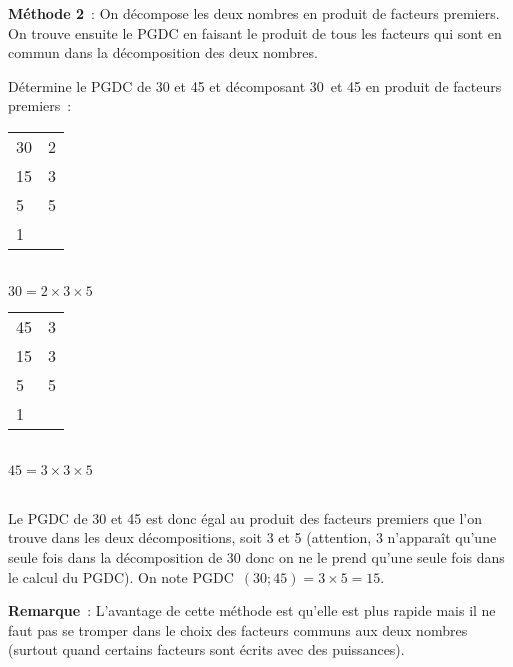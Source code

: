 \newpage




\begin{methode*1}

\textcolor{H1}{\textbf{Méthode 2}} : On décompose les deux nombres en produit de facteurs premiers. On trouve ensuite le PGDC en faisant le produit de tous les facteurs qui sont en commun dans la décomposition des deux nombres.

\begin{exemple*1}
Détermine le PGDC de 30 et 45 et décomposant 30 et 45 en produit de facteurs premiers : \\[1em]
\begin{minipage}[t]{0.26\textwidth}
 \begin{tabularx}{0.3\textwidth}{X|X}
 30 & 2 \\ 
 15 & 3 \\
 5 & 5 \\
 1 & \\ 
 \end{tabularx} \\[1em]
$30 = 2 \times 3 \times 5$ 
\end{minipage} \hfill%
\begin{minipage}[t]{0.56\textwidth}
 \begin{tabularx}{0.3\textwidth}{X|X}
 45 & 3 \\ 
 15 & 3 \\
 5 & 5 \\
 1 & \\ 
 \end{tabularx} \\[1em]
$45 = 3 \times 3 \times 5$

 \end{minipage} \\

Le PGDC de 30 et 45 est donc égal au produit des facteurs premiers que l'on trouve dans les deux décompositions, soit 3 et 5 (attention, 3 n’apparaît qu'une seule fois dans la décomposition de 30 donc on ne le prend qu'une seule fois dans le calcul du PGDC).
On note PGDC $(30 ; 45) = 3 \times 5 = 15$. \\[-2em]
 \end{exemple*1}

 \vspace{1em}

\textcolor{H1}{\textbf{Remarque}} :
L'avantage de cette méthode est qu'elle est plus rapide mais il ne faut pas se tromper dans le choix des facteurs communs aux deux nombres (surtout quand certains facteurs sont écrits avec des puissances).



\end{methode*1}
